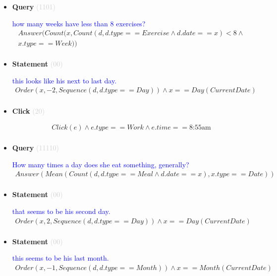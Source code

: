 \documentclass[11pt]{article}
\newcommand{\key}[1]{\textcolor{lightgray}{#1}}
\newcounter{CQuery}
\newcounter{CStatement}
\newcounter{CClick}
\begin{document}
\begin{itemize}
\item
\textbf{Query\theCQuery} \key{(1101)} \addtocounter{CQuery}{1}
\textcolor{blue}{ how many weeks have less than 8 exercises? }
\begin{multline*}
Answer(Count(x, Count(d, d.type==Exercise \wedge d.date==x)<8 \wedge \\ 
x.type==Week)) \\ 
\end{multline*}


\item
\textbf{Statement\theCStatement} \key{(00)} \addtocounter{CStatement}{1}
\textcolor{blue}{ this looks like his next to last day. }
\begin{multline*}
Order(x, -2, Sequence(d, d.type==Day)) \wedge x==Day(CurrentDate) \\ 
\end{multline*}


\item
\textbf{Click\theCClick} \key{(20)} \addtocounter{CClick}{1}
\textcolor{blue}{  }
\begin{multline*}
Click(e) \wedge e.type==Work \wedge e.time==\mbox{8:55am} \\ 
\end{multline*}


\item
\textbf{Query\theCQuery} \key{(11110)} \addtocounter{CQuery}{1}
\textcolor{blue}{ How many times a day does she eat something, generally? }
\begin{multline*}
Answer(Mean(Count(d, d.type==Meal \wedge d.date==x), x.type==Date)) \\ 
\end{multline*}


\item
\textbf{Statement\theCStatement} \key{(00)} \addtocounter{CStatement}{1}
\textcolor{blue}{ that seems to be his second day. }
\begin{multline*}
Order(x, 2, Sequence(d, d.type==Day)) \wedge x==Day(CurrentDate) \\ 
\end{multline*}


\item
\textbf{Statement\theCStatement} \key{(00)} \addtocounter{CStatement}{1}
\textcolor{blue}{ this seems to be his last month. }
\begin{multline*}
Order(x, -1, Sequence(d, d.type==Month)) \wedge x==Month(CurrentDate) \\ 
\end{multline*}



\end{itemize}
\end{document}
